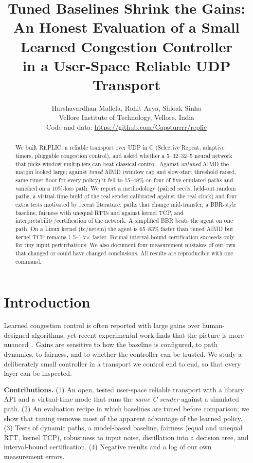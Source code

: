 \documentclass[10pt,twocolumn]{article}
\title{\vspace{-6mm}\textbf{Tuned Baselines Shrink the Gains:\\ An Honest Evaluation of a Small Learned Congestion Controller\\ in a User-Space Reliable UDP Transport}}
\author{Harshavardhan Mallela, Rohit Arya, Shloak Sinha\\ \small Vellore Institute of Technology, Vellore, India\\ \small Code and data: \url{https://github.com/Capsturrrr/replic}}
\date{}
\begin{document}
\maketitle
\begin{abstract}
We built REPLIC, a reliable transport over UDP in C (Selective Repeat, adaptive timers, pluggable congestion control), and asked whether a 5--32--32--5 neural network that picks window multipliers can beat classical control. Against \emph{untuned} AIMD the margin looked large; against \emph{tuned} AIMD (window cap and slow-start threshold raised, same timer floor for every policy) it fell to 15--48\% on four of five emulated paths and vanished on a 10\%-loss path. We report a methodology (paired seeds, held-out random paths, a virtual-time build of the real sender calibrated against the real clock) and four extra tests motivated by recent literature: paths that change mid-transfer, a BBR-style baseline, fairness with unequal RTTs and against kernel TCP, and interpretability/certification of the network. A simplified BBR beats the agent on one path. On a Linux kernel (tc/netem) the agent is 65--83\% faster than tuned AIMD but kernel TCP remains 1.5--1.7$\times$ faster. Formal interval-bound certification succeeds only for tiny input perturbations. We also document four measurement mistakes of our own that changed or could have changed conclusions. All results are reproducible with one command.
\end{abstract}

\section{Introduction}
Learned congestion control is often reported with large gains over human-designed algorithms, yet recent experimental work finds that the picture is more nuanced~\cite{mazilu}. Gains are sensitive to how the baseline is configured, to path dynamics, to fairness, and to whether the controller can be trusted. We study a deliberately small controller in a transport we control end to end, so that every layer can be inspected.

\textbf{Contributions.} (1) An open, tested user-space reliable transport with a library API and a virtual-time mode that runs the \emph{same C sender} against a simulated path. (2) An evaluation recipe in which baselines are tuned before comparison; we show that tuning removes most of the apparent advantage of the learned policy. (3) Tests of dynamic paths, a model-based baseline, fairness (equal and unequal RTT, kernel TCP), robustness to input noise, distillation into a decision tree, and interval-bound certification. (4) Negative results and a log of our own measurement errors.
\end{document}
